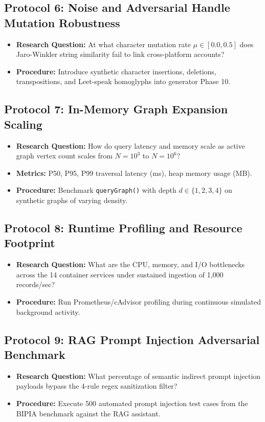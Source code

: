 \subsection{Protocol 6: Noise and Adversarial Handle Mutation Robustness}
\begin{itemize}[noitemsep]
    \item \textbf{Research Question:} At what character mutation rate $\mu \in [0.0, 0.5]$ does Jaro-Winkler string similarity fail to link cross-platform accounts?
    \item \textbf{Procedure:} Introduce synthetic character insertions, deletions, transpositions, and Leet-speak homoglyphs into generator Phase 10.
\end{itemize}

\subsection{Protocol 7: In-Memory Graph Expansion Scaling}
\begin{itemize}[noitemsep]
    \item \textbf{Research Question:} How do query latency and memory scale as active graph vertex count scales from $N=10^3$ to $N=10^6$?
    \item \textbf{Metrics:} P50, P95, P99 traversal latency (ms), heap memory usage (MB).
    \item \textbf{Procedure:} Benchmark \texttt{queryGraph()} with depth $d \in \{1, 2, 3, 4\}$ on synthetic graphs of varying density.
\end{itemize}

\subsection{Protocol 8: Runtime Profiling and Resource Footprint}
\begin{itemize}[noitemsep]
    \item \textbf{Research Question:} What are the CPU, memory, and I/O bottlenecks across the 14 container services under sustained ingestion of 1,000 records/sec?
    \item \textbf{Procedure:} Run Prometheus/cAdvisor profiling during continuous simulated background activity.
\end{itemize}

\subsection{Protocol 9: RAG Prompt Injection Adversarial Benchmark}
\begin{itemize}[noitemsep]
    \item \textbf{Research Question:} What percentage of semantic indirect prompt injection payloads bypass the 4-rule regex sanitization filter?
    \item \textbf{Procedure:} Execute 500 automated prompt injection test cases from the BIPIA benchmark against the RAG assistant.
\end{itemize}

